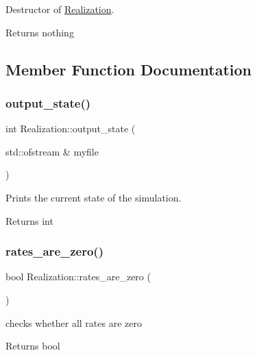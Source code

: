 Destructor of \hyperlink{class_realization}{Realization}. 

\begin{DoxyReturn}{Returns}
nothing 
\end{DoxyReturn}


\subsection{Member Function Documentation}
\mbox{\label{class_realization_ab7ef90279eef4bf11261084f541c7bb0}} 
\subsubsection{\texorpdfstring{output\+\_\+state()}{output\_state()}}
{\footnotesize\ttfamily int Realization\+::output\+\_\+state (\begin{DoxyParamCaption}\item[{std\+::ofstream \&}]{myfile }\end{DoxyParamCaption})}



Prints the current state of the simulation. 

\begin{DoxyReturn}{Returns}
int 
\end{DoxyReturn}
\mbox{\label{class_realization_a48953442ebf235cd1e02731c7419f65f}} 
\subsubsection{\texorpdfstring{rates\+\_\+are\+\_\+zero()}{rates\_are\_zero()}}
{\footnotesize\ttfamily bool Realization\+::rates\+\_\+are\+\_\+zero (\begin{DoxyParamCaption}{ }\end{DoxyParamCaption})}



checks whether all rates are zero 

\begin{DoxyReturn}{Returns}
bool 
\end{DoxyReturn}
\mbox{\label{class_realization_a391a89af7574a9053f53f8a299c2cc70}} 
